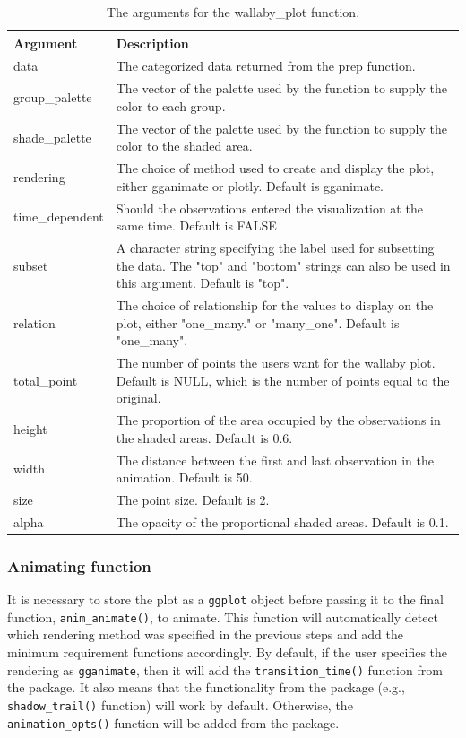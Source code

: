 \begin{table}

\caption{\label{tab:unnamed-chunk-8}The arguments for the wallaby\_plot function.}
\centering
\begin{tabular}[t]{l|>{\raggedright\arraybackslash}p{30em}}
\hline
Argument & Description\\
\hline
data & The categorized data returned from the prep function.\\
\hline
group\_palette & The vector of the palette used by the function to supply the color to each group.\\
\hline
shade\_palette & The vector of the palette used by the function to supply the color to the shaded area.\\
\hline
rendering & The choice of method used to create and display the plot, either gganimate or plotly. Default is gganimate.\\
\hline
time\_dependent & Should the observations entered the visualization at the same time. Default is FALSE\\
\hline
subset & A character string specifying the label used for subsetting the data. The "top" and "bottom" strings can also be used in this argument. Default is "top".\\
\hline
relation & The choice of relationship for the values to display on the plot, either "one\_many." or "many\_one". Default is "one\_many".\\
\hline
total\_point & The number of points the users want for the wallaby plot. Default is NULL, which is the number of points equal to the original.\\
\hline
height & The proportion of the area occupied by the observations in the shaded areas. Default is 0.6.\\
\hline
width & The distance between the first and last observation in the animation. Default is 50.\\
\hline
size & The point size. Default is 2.\\
\hline
alpha & The opacity of the proportional shaded areas. Default is 0.1.\\
\hline
\end{tabular}
\end{table}

\subsubsection{Animating function}\label{animating-function}

It is necessary to store the plot as a \texttt{ggplot} object before passing it to the final function, \texttt{anim\_animate()}, to animate. This function will automatically detect which rendering method was specified in the previous steps and add the minimum requirement functions accordingly. By default, if the user specifies the rendering as \texttt{gganimate}, then it will add the \texttt{transition\_time()} function from the  package. It also means that the functionality from the  package (e.g., \texttt{shadow\_trail()} function) will work by default. Otherwise, the \texttt{animation\_opts()} function will be added from the  package.


